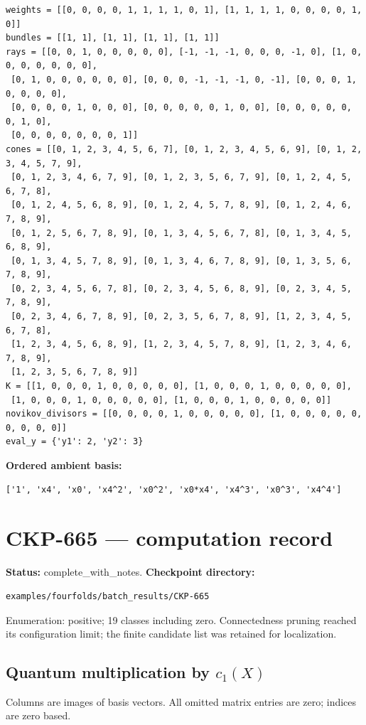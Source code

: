\documentclass[10pt,a4paper]{article}
\begin{document}
\begin{lstlisting}
weights = [[0, 0, 0, 0, 1, 1, 1, 1, 0, 1], [1, 1, 1, 1, 0, 0, 0, 0, 1, 0]]
bundles = [[1, 1], [1, 1], [1, 1], [1, 1]]
rays = [[0, 0, 1, 0, 0, 0, 0, 0], [-1, -1, -1, 0, 0, 0, -1, 0], [1, 0, 0, 0, 0, 0, 0, 0],
 [0, 1, 0, 0, 0, 0, 0, 0], [0, 0, 0, -1, -1, -1, 0, -1], [0, 0, 0, 1, 0, 0, 0, 0],
 [0, 0, 0, 0, 1, 0, 0, 0], [0, 0, 0, 0, 0, 1, 0, 0], [0, 0, 0, 0, 0, 0, 1, 0],
 [0, 0, 0, 0, 0, 0, 0, 1]]
cones = [[0, 1, 2, 3, 4, 5, 6, 7], [0, 1, 2, 3, 4, 5, 6, 9], [0, 1, 2, 3, 4, 5, 7, 9],
 [0, 1, 2, 3, 4, 6, 7, 9], [0, 1, 2, 3, 5, 6, 7, 9], [0, 1, 2, 4, 5, 6, 7, 8],
 [0, 1, 2, 4, 5, 6, 8, 9], [0, 1, 2, 4, 5, 7, 8, 9], [0, 1, 2, 4, 6, 7, 8, 9],
 [0, 1, 2, 5, 6, 7, 8, 9], [0, 1, 3, 4, 5, 6, 7, 8], [0, 1, 3, 4, 5, 6, 8, 9],
 [0, 1, 3, 4, 5, 7, 8, 9], [0, 1, 3, 4, 6, 7, 8, 9], [0, 1, 3, 5, 6, 7, 8, 9],
 [0, 2, 3, 4, 5, 6, 7, 8], [0, 2, 3, 4, 5, 6, 8, 9], [0, 2, 3, 4, 5, 7, 8, 9],
 [0, 2, 3, 4, 6, 7, 8, 9], [0, 2, 3, 5, 6, 7, 8, 9], [1, 2, 3, 4, 5, 6, 7, 8],
 [1, 2, 3, 4, 5, 6, 8, 9], [1, 2, 3, 4, 5, 7, 8, 9], [1, 2, 3, 4, 6, 7, 8, 9],
 [1, 2, 3, 5, 6, 7, 8, 9]]
K = [[1, 0, 0, 0, 1, 0, 0, 0, 0, 0], [1, 0, 0, 0, 1, 0, 0, 0, 0, 0],
 [1, 0, 0, 0, 1, 0, 0, 0, 0, 0], [1, 0, 0, 0, 1, 0, 0, 0, 0, 0]]
novikov_divisors = [[0, 0, 0, 0, 1, 0, 0, 0, 0, 0], [1, 0, 0, 0, 0, 0, 0, 0, 0, 0]]
eval_y = {'y1': 2, 'y2': 3}
\end{lstlisting}

\textbf{Ordered ambient basis:}
\begin{lstlisting}
['1', 'x4', 'x0', 'x4^2', 'x0^2', 'x0*x4', 'x4^3', 'x0^3', 'x4^4']
\end{lstlisting}

\clearpage\section*{CKP-665 --- computation record}
\textbf{Status:} complete\_with\_notes.
\textbf{Checkpoint directory:}
\begin{lstlisting}
examples/fourfolds/batch_results/CKP-665
\end{lstlisting}

Enumeration: positive; 19 classes including zero.
Connectedness pruning reached its configuration limit; the finite candidate list was retained for localization.
\subsection*{Quantum multiplication by $c_1(X)$}
Columns are images of basis vectors. All omitted matrix entries are zero; indices are zero based.
\end{document}
